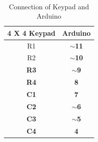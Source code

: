 \paragraph{}
\begin{table}[H]
\centering
\begin{tabular}{|c|c|}
\hline
4 X 4 Keypad & Arduino           \\ \hline
R1           & \textbf{$\sim$11} \\ \hline
R2           & \textbf{$\sim$10} \\ \hline
\textbf{R3}  & \textbf{$\sim$9}  \\ \hline
\textbf{R4}  & \textbf{8}        \\ \hline
\textbf{C1}  & \textbf{7}        \\ \hline
\textbf{C2}  & \textbf{$\sim$6}  \\ \hline
\textbf{C3}  & \textbf{$\sim$5}  \\ \hline
\textbf{C4}  & \textbf{4}        \\ \hline
\end{tabular}
\caption{Connection of Keypad and Arduino}
\end{table}


